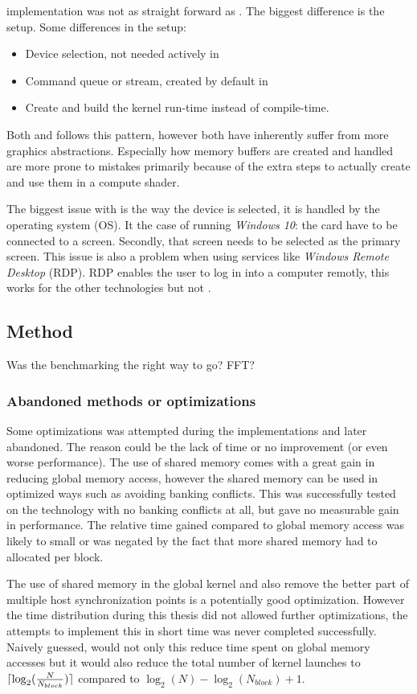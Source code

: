 {\OCL} implementation was not as straight forward as {\CU}. The biggest difference is the setup. Some differences in the setup:
\begin{itemize}
	\item Device selection, not needed actively in {\CU}
	\item Command queue or stream, created by default in {\CU}
	\item Create and build the kernel run-time instead of compile-time.
\end{itemize}
Both {\DX} and {\GL} follows this pattern, however both have inherently suffer from more graphics abstractions. Especially how memory buffers are created and handled are more prone to mistakes primarily because of the extra steps to actually create and use them in a compute shader.

The biggest issue with {\GL} is the way the device is selected, it is handled by the operating system (OS). It the case of running \textit{Windows 10}: the card have to be connected to a screen. Secondly, that screen needs to be selected as the primary screen. This issue is also a problem when using services like \textit{Windows Remote Desktop} (RDP). RDP enables the user to log in into a computer remotly, this works for the other technologies but not {\GL}.

\subsection{Method}

Was the benchmarking the right way to go? FFT?

\subsubsection{Abandoned methods or optimizations}

Some optimizations was attempted during the implementations and later abandoned. The reason could be the lack of time or no improvement (or even worse performance). The use of shared memory comes with a great gain in reducing global memory access, however the shared memory can be used in optimized ways such as avoiding banking conflicts. This was successfully tested on the {\CU} technology with no banking conflicts at all, but gave no measurable gain in performance. The relative time gained compared to global memory access was likely to small or was negated by the fact that more shared memory had to allocated per block.

The use of shared memory in the global kernel and also remove the better part of multiple host synchronization points is a potentially good optimization. However the time distribution during this thesis did not allowed further optimizations, the attempts to implement this in short time was never completed successfully. Naively guessed, would not only this reduce time spent on global memory accesses but it would also reduce the total number of kernel launches to $\lceil\log_{2}(\frac{N}{N_{block}})\rceil$ compared to $\log_{2}(N) - \log_{2}(N_{block}) + 1$.

